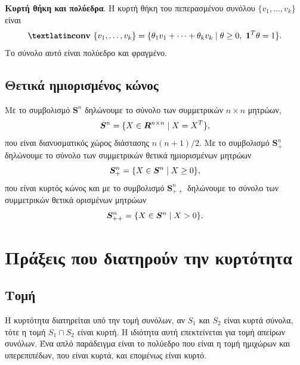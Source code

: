 \textbf{Κυρτή θήκη και πολύεδρα}. Η κυρτή θήκη του πεπερασμένου συνόλου
$\{v_1,\dots,v_k\}$ είναι
\begin{equation*}
    \textbf{\tl{conv}}\ \{v_1,\dots,v_k\} = \{\theta_1 v_1+\dots+\theta_k v_k
    \mid \theta \geq 0,\ \vc{1}^T\theta = 1\}.
\end{equation*}
Το σύνολο αυτό είναι πολύεδρο και φραγμένο.

\subsection{Θετικά ημιορισμένος κώνος} Με το συμβολισμό $\mathbf{S}^n$ δηλώνουμε
το σύνολο των συμμετρικών $n \times n$ μητρώων,
\begin{equation*}
    \boldsymbol{S}^n = \{ X \in \boldsymbol{R}^{n \times n} \mid X = X^T\},
\end{equation*}
που είναι διανυσματικός χώρος διάστασης $n(n+1)/2$. Με το συμβολισμό
$\mathbf{S}_+^n$ δηλώνουμε το σύνολο των συμμετρικών θετικά ημιορισμένων μητρώων
\begin{equation*}
    \boldsymbol{S}_+^n = \{ X \in \boldsymbol{S}^{n} \mid X \geq 0\},
\end{equation*}
που είναι κυρτός κώνος και με το συμβολισμό $\mathbf{S}_{++}^n$ δηλώνουμε
το σύνολο των συμμετρικών θετικά ορισμένων μητρώων
\begin{equation*}
    \boldsymbol{S}_{++}^n = \{ X \in \boldsymbol{S}^{n} \mid X > 0\}.
\end{equation*}

\section{Πράξεις που διατηρούν την κυρτότητα}

\subsection{Τομή} Η κυρτότητα διατηρείται υπό την τομή συνόλων, αν $S_1$
και $S_2$ είναι κυρτά σύνολα, τότε η τομή $S_1 \cap S_2$ είναι κυρτή.
Η ιδιότητα αυτή επεκτείνεται για τομή απείρων συνόλων. Ένα απλό παράδειγμα
είναι το πολύεδρο που είναι η τομή ημιχώρων και υπερεπιπέδων, που είναι κυρτά,
και επομένως είναι κυρτό.

